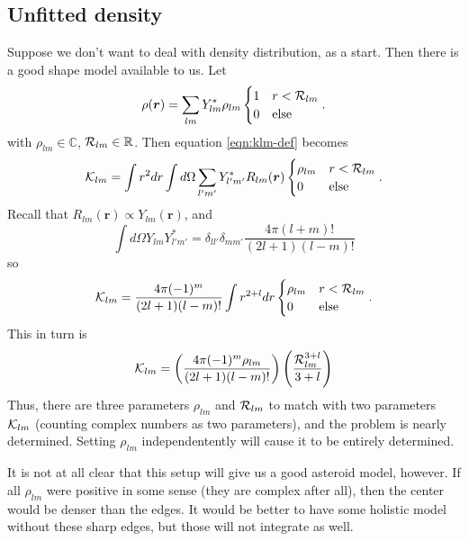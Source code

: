 \documentclass[aps,twocolumn,secnumarabic,balancelastpage,amsmath,amssymb,nofootinbib,floatfix]{revtex4-1}
\begin{document}
\subsection{Unfitted density}
Suppose we don't want to deal with density distribution, as a start. Then there is a good shape model available to us. Let
\begin{equation}
    \rho(\bm r) = \sum_{lm} Y_{lm}^* \rho_{lm} \begin{cases}
        1 & r < \mathcal{R}_{lm}\\
        0 & \text{else}
    \end{cases}.
\end{equation}
with $\rho_{lm} \in \mathbb{C}$, $\mathcal{R}_{lm} \in \mathbb{R}$. Then equation \ref{eqn:klm-def} becomes
\begin{equation*}
    \mathcal{K}_{lm} = \int r^2 dr \int d\Omega \sum_{l'm'} Y_{l'm'}^* R_{lm}(\bm r) \begin{cases}
        \rho_{lm} & r < \mathcal{R}_{lm}\\
        0 & \text{else}
    \end{cases}.
\end{equation*}
Recall that $R_{lm}(\bm r) \propto Y_{lm}(\bm r)$, and
$$\int d\Omega Y_{lm}Y^*_{l'm'} = \delta_{ll'}\delta_{mm'} \frac{4\pi (l+m)!}{(2l+1)(l-m)!}$$
so
\begin{equation*}
    \mathcal{K}_{lm} = \frac{4\pi (-1)^m }{(2l+1)(l-m)!} \int r^{2+l} dr \begin{cases}
        \rho_{lm} & r < \mathcal{R}_{lm}\\
        0 & \text{else}
    \end{cases}.
\end{equation*}
This in turn is
\begin{equation*}
    \mathcal{K}_{lm} = \left( \frac{4\pi (-1)^m \rho_{lm}}{(2l+1)(l-m)!} \right) \left( \frac{\mathcal{R}_{lm}^{3+l}}{3+l} \right)
\end{equation*}
Thus, there are three parameters $\rho_{lm}$ and $\mathcal{R}_{lm}$ to match with two parameters $\mathcal{K}_{lm}$ (counting complex numbers as two parameters), and the problem is nearly determined. Setting $\rho_{lm}$ independentently will cause it to be entirely determined.

It is not at all clear that this setup will give us a good asteroid model, however. If all $\rho_{lm}$ were positive in some sense (they are complex after all), then the center would be denser than the edges. It would be better to have some holistic model without these sharp edges, but those will not integrate as well.



\end{document}
